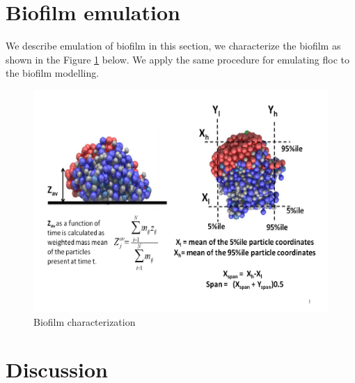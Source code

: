 \section{Biofilm emulation}
We describe emulation of biofilm in this section, we characterize the biofilm as shown in the Figure \ref{diag22} below. We apply the same procedure for emulating floc to the biofilm modelling.

\begin{figure}[!ht] 
\includegraphics[width=1.1\textwidth]{result2/bio_char}
\caption[]{Biofilm characterization}\label{diag22}
\end{figure}

\section{Discussion}

